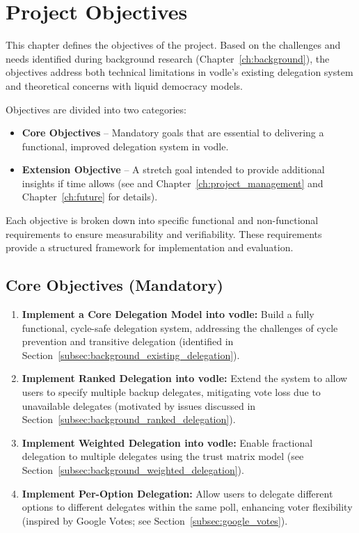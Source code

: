 \chapter{Project Objectives}
\label{ch:project_objectives}

This chapter defines the objectives of the project. Based on the challenges and needs identified during background research (Chapter~\ref{ch:background}), the objectives address both technical limitations in vodle's existing delegation system and theoretical concerns with liquid democracy models.

Objectives are divided into two categories:
\begin{itemize}
    \item \textbf{Core Objectives} -- Mandatory goals that are essential to delivering a functional, improved delegation system in vodle.
    \item \textbf{Extension Objective} -- A stretch goal intended to provide additional insights if time allows (see and Chapter~\ref{ch:project_management} and Chapter~\ref{ch:future} for details).
\end{itemize}

Each objective is broken down into specific functional and non-functional requirements to ensure measurability and verifiability. These requirements provide a structured framework for implementation and evaluation.

\section{Core Objectives (Mandatory)}
\begin{enumerate}
    \item \textbf{Implement a Core Delegation Model into vodle:} Build a fully functional, cycle-safe delegation system, addressing the challenges of cycle prevention and transitive delegation (identified in Section~\ref{subsec:background_existing_delegation}).

    \item \textbf{Implement Ranked Delegation into vodle:} Extend the system to allow users to specify multiple backup delegates, mitigating vote loss due to unavailable delegates (motivated by issues discussed in Section~\ref{subsec:background_ranked_delegation}).

    \item \textbf{Implement Weighted Delegation into vodle:} Enable fractional delegation to multiple delegates using the trust matrix model (see Section~\ref{subsec:background_weighted_delegation}).

    \item \textbf{Implement Per-Option Delegation:} Allow users to delegate different options to different delegates within the same poll, enhancing voter flexibility (inspired by Google Votes; see Section~\ref{subsec:google_votes}).
\end{enumerate}

